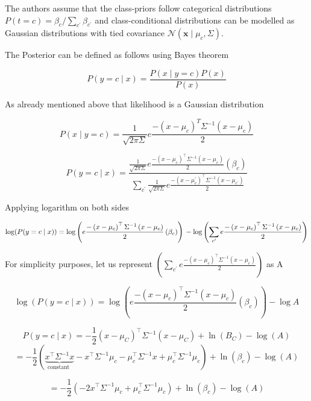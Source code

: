     The authors assume that the class-priors follow categorical distributions $P(t=c)=\beta_{c} / \sum_{c^{\prime}} \beta_{c^{\prime}}$ and class-conditional distributions can be modelled as Gaussian distributions with tied covariance $\mathcal{N}\left(\mathbf{x} \mid \mu_{c}, \Sigma\right)$. 
    
    The Posterior can be defined as follows using Bayes theorem
    
    $$P(y=c \mid x)=\frac{P(x \mid y=c) P(x)}{P(x)}$$
    
    As already mentioned above that likelihood is a Gaussian distribution
    
    $$P(x \mid y=c)=\frac{1}{\sqrt{2 \pi \Sigma}} e \frac{-\left(x-\mu_{c}\right)^{T} \Sigma^{-1}\left(x-\mu_{c}\right)}{2}$$
    
    $$ P(y=c \mid x)=\frac{\frac{1}{\sqrt{2 \pi \Sigma}} e \frac{-\left(x-\mu_{c}\right)^{\top} \Sigma^{-1}\left(x-\mu_{c}\right)}{2}\left(\beta_{c}\right)}{\sum_{c^{\prime}} \frac{1}{\sqrt{2 \pi \Sigma}} e \frac{-\left(x-\mu_{c}^{\prime}\right)^{\top} \Sigma^{-1}\left(x-\mu_{c^{\prime}}\right)}{2}}$$
    
    Applying logarithm on both sides 
    
    $$\log (P(y=c \mid x)) =\log \left(e \frac{-\left(x-\mu_{c}\right)^{\top} \Sigma^{-1}\left(x-\mu_{c}\right)}{2}\left(\beta_{c}\right)\right) \\ -\log \left(\sum_{c^{\prime}} e \frac{-\left(x-\mu_{c}\right)^{\top} \Sigma^{-1}\left(x-\mu_{c}\right)}{2}\right)$$
    
    For simplicity purposes, let us represent  $\left(\sum_{c^{\prime}} e \frac{-\left(x-\mu_{c}\right)^{\top} \Sigma^{-1}\left(x-\mu_{c}\right)}{2}\right)$ as A 
    
    $$\log (P(y=c \mid x)) =\log \left(e \frac{-\left(x-\mu_{c}\right)^{\top} \Sigma^{-1}\left(x-\mu_{c}\right)}{2}\left(\beta_{c}\right)\right) -\log A$$
    
    $$ P(y=c \mid x) = -\frac{1}{2}\left(x-\mu_{C}\right)^{\top} \Sigma^{-1}\left(x-\mu_{C}\right)+\ln \left(B_{C}\right)-\log (A) $$
    $$ = -\frac{1}{2}(\underbrace{x^{\top} \Sigma^{-1} x}_{\text {constant }}-x^{\top} \Sigma^{-1} \mu_{c}-\mu_{c}^{\top} \Sigma^{-1} x+\mu_{c}^{\top} \Sigma^{-1} \mu_{c})+\ln \left(\beta_{c}\right)-\log (A) $$
    
    $$ =-\frac{1}{2}\left(-2 x^{\top} \Sigma^{-1} \mu_{c}+\mu_{c}^{\top} \Sigma^{-1} \mu_{c}\right)+\ln \left(\beta_{c}\right)-\log (A) $$
            
